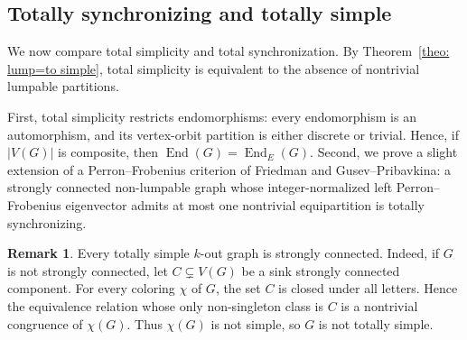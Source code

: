 \documentclass[a4paper,10pt]{amsart}
\theoremstyle{plain}
\theoremstyle{definition}
\newtheorem{remark}[theorem]{Remark}
\DeclareMathOperator{\End}{End}
\begin{document}
\subsection{Totally synchronizing and totally simple}
We now compare total simplicity and total synchronization.
By Theorem~\ref{theo: lump=to simple}, total simplicity is equivalent to the absence of nontrivial lumpable partitions.

First, total simplicity restricts endomorphisms: every endomorphism is an automorphism, and its vertex-orbit partition is either discrete or trivial.
Hence, if $|V(G)|$ is composite, then $\End(G)=\End_E(G)$.
Second, we prove a slight extension of a Perron--Frobenius criterion of Friedman and Gusev--Pribavkina: a strongly connected non-lumpable graph whose integer-normalized left Perron--Frobenius eigenvector admits at most one nontrivial equipartition is totally synchronizing.

\begin{remark}\label{rem:totally-simple-strongly-connected}
Every totally simple $k$-out graph is strongly connected. Indeed, if $G$ is not strongly connected,
let $C\subsetneq V(G)$ be a sink strongly connected component. For every coloring $\chi$ of $G$,
the set $C$ is closed under all letters. Hence the equivalence relation whose only non-singleton
class is $C$ is a nontrivial congruence of $\chi(G)$. Thus $\chi(G)$ is not simple, so $G$ is not
totally simple.
\end{remark}
\end{document}
